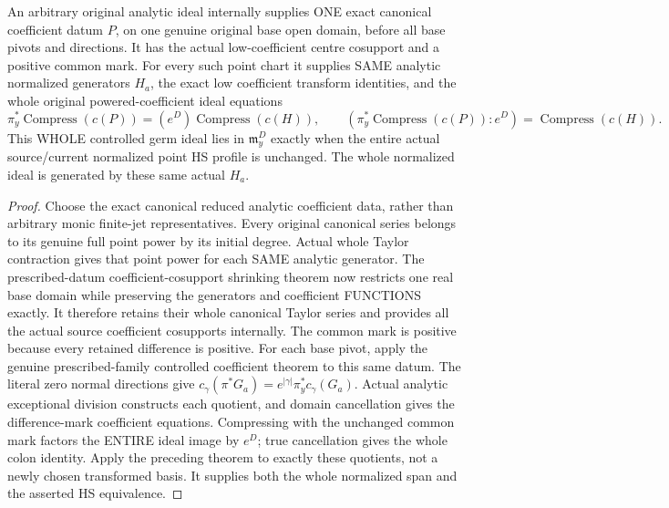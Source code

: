 \begin{theorem}
\label{hir:actual-original-point-weighted-coefficient-tracking}
\leanok
An arbitrary original analytic ideal internally supplies ONE exact canonical
coefficient datum $P$, on one genuine original base open domain, before all
base pivots and directions. It has the actual low-coefficient centre cosupport
and a positive common mark. For every such point chart it supplies SAME
analytic normalized generators $H_a$, the exact low coefficient transform
identities, and the whole original powered-coefficient ideal equations
\[
 \pi_y^*\operatorname{Compress}(c(P))
    =(e^D)\operatorname{Compress}(c(H)),\qquad
 (\pi_y^*\operatorname{Compress}(c(P)):e^D)
    =\operatorname{Compress}(c(H)).
\]
This WHOLE controlled germ ideal lies in $\mathfrak m_y^D$ exactly when the
entire actual source/current normalized point HS profile is unchanged.
The whole normalized ideal is generated by these same actual $H_a$.
\end{theorem}
\begin{proof}
Choose the exact canonical reduced analytic coefficient data, rather than
arbitrary monic finite-jet representatives. Every original canonical series
belongs to its genuine full point power by its initial degree. Actual whole
Taylor contraction gives that point power for each SAME analytic generator.
The prescribed-datum coefficient-cosupport shrinking theorem now restricts
one real base domain while preserving the generators and coefficient
FUNCTIONS exactly. It therefore retains their whole canonical Taylor series
and provides all the actual source coefficient cosupports internally.
The common mark is positive because every retained difference is positive.
For each base pivot, apply the genuine prescribed-family controlled
coefficient theorem to this same datum. The literal zero normal directions
give $c_\gamma(\pi^*G_a)=e^{|\gamma|}\pi_y^*c_\gamma(G_a)$.
Actual analytic exceptional division constructs each quotient, and domain
cancellation gives the difference-mark coefficient equations. Compressing
with the unchanged common mark factors the ENTIRE ideal image by $e^D$;
true cancellation gives the whole colon identity. Apply the preceding
theorem to exactly these quotients, not a newly chosen transformed basis.
It supplies both the whole normalized span and the asserted HS equivalence.
\end{proof}

